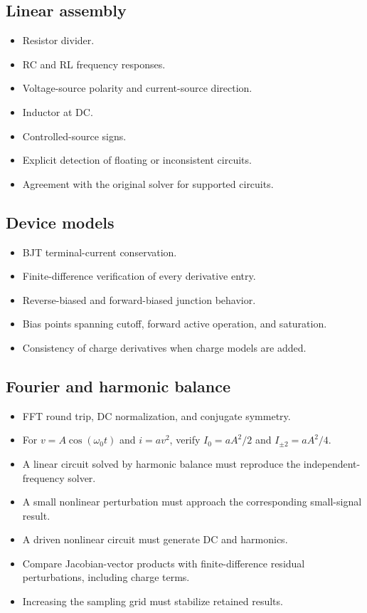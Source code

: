 \documentclass[11pt,a4paper]{article}
\begin{document}
\subsection{Linear assembly}
\begin{itemize}
 \item Resistor divider.
 \item RC and RL frequency responses.
 \item Voltage-source polarity and current-source direction.
 \item Inductor at DC.
 \item Controlled-source signs.
 \item Explicit detection of floating or inconsistent circuits.
 \item Agreement with the original solver for supported circuits.
\end{itemize}

\subsection{Device models}
\begin{itemize}
 \item BJT terminal-current conservation.
 \item Finite-difference verification of every derivative entry.
 \item Reverse-biased and forward-biased junction behavior.
 \item Bias points spanning cutoff, forward active operation, and saturation.
 \item Consistency of charge derivatives when charge models are added.
\end{itemize}

\subsection{Fourier and harmonic balance}
\begin{itemize}
 \item FFT round trip, DC normalization, and conjugate symmetry.
 \item For $v=A\cos(\omega_0t)$ and $i=a v^2$, verify
       $I_0=aA^2/2$ and $I_{\pm2}=aA^2/4$.
 \item A linear circuit solved by harmonic balance must reproduce the
       independent-frequency solver.
 \item A small nonlinear perturbation must approach the corresponding
       small-signal result.
 \item A driven nonlinear circuit must generate DC and harmonics.
 \item Compare Jacobian-vector products with finite-difference residual
       perturbations, including charge terms.
 \item Increasing the sampling grid must stabilize retained results.
\end{itemize}
\end{document}
